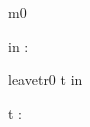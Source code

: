 \documentclass[12pt]{amsart}
\title{}
\author{}
\date{} %
\begin{document}
\maketitle
\tableofcontents


\begin{machine}{m0}


%
	\begin{variable}
		in : \set[\TRAIN]
	\end{variable}
%



\begin{transient}{leave}{tr0}
	t \in in
\end{transient}

\begin{dummy}
	t : \TRAIN
\end{dummy}


\end{machine}
\end{document}
